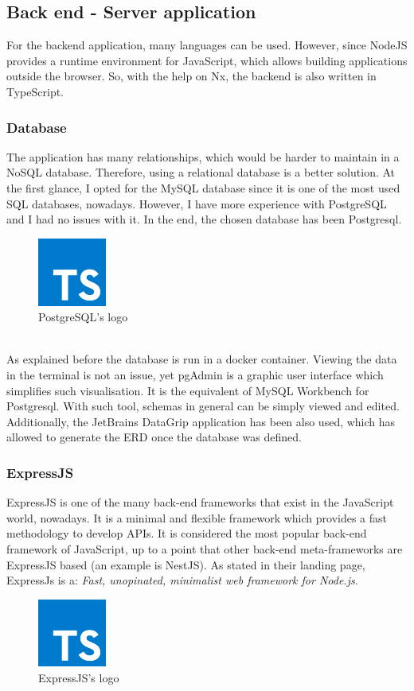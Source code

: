 \documentclass[a4paper, 12pt, oneside]{book}
\begin{document}
\subsection{Back end - Server application}
For the backend application, many languages can be used. However, since NodeJS provides a runtime environment for JavaScript, which allows building applications outside the browser. So, with the help on Nx, the backend is also written in TypeScript.
\subsubsection{Database}
The application has many relationships, which would be harder to maintain in a NoSQL database. Therefore, using a relational database is a better solution. At the first glance, I opted for the MySQL database since it is one of the most used SQL databases, nowadays. However, I have more experience with PostgreSQL and I had no issues with it. In the end, the chosen database has been Postgresql.
\\
\begin{figure}[h!]
	\centering
	\includegraphics[width=0.2\textwidth]{assets/ts-logo.png}
	\caption{PostgreSQL's logo}
\end{figure}
\\
As explained before the database is run in a docker container. Viewing the data in the terminal is not an issue, yet pgAdmin is a graphic user interface which simplifies such visualisation. It is the equivalent of MySQL Workbench for Postgresql. With such tool, schemas in general can be simply viewed and edited. Additionally, the JetBrains DataGrip application has been also used, which has allowed to generate the ERD once the database was defined.
\subsubsection{ExpressJS}
ExpressJS is one of the many back-end frameworks that exist in the JavaScript world, nowadays. It is a minimal and flexible framework which provides a fast methodology to develop APIs. It is considered the most popular back-end framework of JavaScript, up to a point that other back-end meta-frameworks are ExpressJS based (an example is NestJS). As stated in their landing page, ExpressJs is a: \emph{Fast, unopinated, minimalist web framework for Node.js}.
\\
\begin{figure}[h!]
	\centering
	\includegraphics[width=0.2\textwidth]{assets/ts-logo.png}
	\caption{ExpressJS's logo}
\end{figure}
\end{document}
